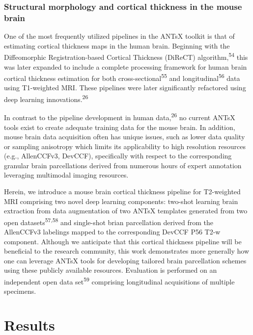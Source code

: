 \documentclass[
  12pt,
]{article}
\begin{document}
\hypertarget{structural-morphology-and-cortical-thickness-in-the-mouse-brain}{%
\subsubsection{Structural morphology and cortical thickness in the mouse
brain}\label{structural-morphology-and-cortical-thickness-in-the-mouse-brain}}

One of the most frequently utilized pipelines in the ANTsX toolkit is
that of estimating cortical thickness maps in the human brain. Beginning
with the Diffeomorphic Registration-based Cortical Thickness (DiReCT)
algorithm,\textsuperscript{54} this was later expanded to include a
complete processing framework for human brain cortical thickness
estimation for both cross-sectional\textsuperscript{55} and
longitudinal\textsuperscript{56} data using T1-weighted MRI. These
pipelines were later significantly refactored using deep learning
innovations.\textsuperscript{26}

In contrast to the pipeline development in human
data,\textsuperscript{26} no current ANTsX tools exist to create
adequate training data for the mouse brain. In addition, mouse brain
data acquisition often has unique issues, such as lower data quality or
sampling anisotropy which limits its applicability to high resolution
resources (e.g., AllenCCFv3, DevCCF), specifically with respect to the
corresponding granular brain parcellations derived from numerous hours
of expert annotation leveraging multimodal imaging resources.

Herein, we introduce a mouse brain cortical thickness pipeline for
T2-weighted MRI comprising two novel deep learning components: two-shot
learning brain extraction from data augmentation of two ANTsX templates
generated from two open datasets\textsuperscript{57,58} and single-shot
brian parcellation derived from the AllenCCFv3 labelings mapped to the
corresponding DevCCF P56 T2-w component. Although we anticipate that
this cortical thickness pipeline will be beneficial to the research
community, this work demonstrates more generally how one can leverage
ANTsX tools for developing tailored brain parcellation schemes using
these publicly available resources. Evaluation is performed on an
independent open data set\textsuperscript{59} comprising longitudinal
acquisitions of multiple specimens.

\clearpage
\newpage

\hypertarget{results}{%
\section{Results}\label{results}}
\end{document}
